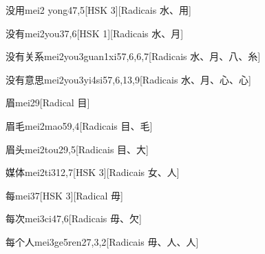 \begin{entry}{没用}{mei2 yong4}{7,5}[HSK 3][Radicais ⽔、⽤]
\end{entry}

\begin{entry}{没有}{mei2you3}{7,6}[HSK 1][Radicais ⽔、⽉]
\end{entry}

\begin{entry}{没有关系}{mei2you3guan1xi5}{7,6,6,7}[Radicais ⽔、⽉、⼋、⽷]
\end{entry}

\begin{entry}{没有意思}{mei2you3yi4si5}{7,6,13,9}[Radicais ⽔、⽉、⼼、⼼]
\end{entry}

\begin{entry}{眉}{mei2}{9}[Radical ⽬]
\end{entry}

\begin{entry}{眉毛}{mei2mao5}{9,4}[Radicais ⽬、⽑]
\end{entry}

\begin{entry}{眉头}{mei2tou2}{9,5}[Radicais ⽬、⼤]
\end{entry}

\begin{entry}{媒体}{mei2ti3}{12,7}[HSK 3][Radicais ⼥、⼈]
\end{entry}

\begin{entry}{每}{mei3}{7}[HSK 3][Radical ⽏]
\end{entry}

\begin{entry}{每次}{mei3ci4}{7,6}[Radicais ⽏、⽋]
\end{entry}

\begin{entry}{每个人}{mei3ge5ren2}{7,3,2}[Radicais ⽏、⼈、⼈]
\end{entry}

